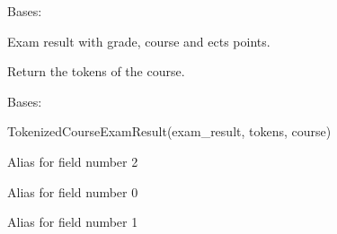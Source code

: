 \documentclass[letterpaper,10pt,english]{sphinxmanual}
\begin{document}
\begin{fulllineitems}
\label{cv_kickstarter:cv_kickstarter.dtu_skill_set.ExamResult}
Bases: 

Exam result with grade, course and ects points.

\begin{fulllineitems}
\label{cv_kickstarter:cv_kickstarter.dtu_skill_set.ExamResult.course_tokens}
Return the tokens of the course.

\end{fulllineitems}


\end{fulllineitems}


\begin{fulllineitems}
\label{cv_kickstarter:cv_kickstarter.dtu_skill_set.TokenizedCourseExamResult}
Bases: 

TokenizedCourseExamResult(exam\_result, tokens, course)

\begin{fulllineitems}
\label{cv_kickstarter:cv_kickstarter.dtu_skill_set.TokenizedCourseExamResult.course}
Alias for field number 2

\end{fulllineitems}


\begin{fulllineitems}
\label{cv_kickstarter:cv_kickstarter.dtu_skill_set.TokenizedCourseExamResult.exam_result}
Alias for field number 0

\end{fulllineitems}


\begin{fulllineitems}
\label{cv_kickstarter:cv_kickstarter.dtu_skill_set.TokenizedCourseExamResult.tokens}
Alias for field number 1

\end{fulllineitems}


\end{fulllineitems}
\end{document}
